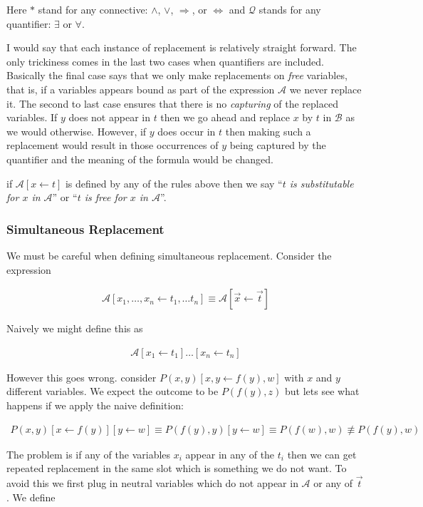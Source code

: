 \documentclass[12pt]{article}
\newcommand{\mc}[1]{\mathcal{#1}}
\begin{document}
Here $\ast$ stand for any connective: $\land$, $\lor$, $\Rightarrow$, or $\Leftrightarrow$ and $\mathcal{Q}$ stands for any quantifier: $\exists$ or $\forall$.

I would say that each instance of replacement is relatively straight forward. The only trickiness comes in the last two cases when quantifiers are included. Basically the final case says that we only make replacements on \textit{free} variables, that is, if a variables appears bound as part of the expression $\mc{A}$ we never replace it.
The second to last case ensures that there is no \textit{capturing} of the replaced variables. If $y$ does not appear in $t$ then we go ahead and replace $x$ by $t$ in $\mc{B}$ as we would otherwise. However, if $y$ does occur in $t$ then making such a replacement would result in those occurrences of $y$ being captured by the quantifier and the meaning of the formula would be changed.

if $\mc{A}[x\leftarrow t]$ is defined by any of the rules above then we say ``\textit{$t$ is substitutable for $x$ in $\mc{A}$}'' or ``\textit{$t$ is free for $x$ in $\mc{A}$}''.

\subsubsection*{Simultaneous Replacement}

We must be careful when defining simultaneous replacement. Consider the expression

\begin{align}
\mc{A}[x_1,\ldots, x_n\leftarrow t_1,\ldots t_n] \equiv \mc{A}[\vec{x}\leftarrow \vec{t}]
\end{align}

Naively we might define this as 

\begin{align}
\mc{A}[x_1\leftarrow t_1]\ldots[x_n\leftarrow t_n]
\end{align}

However this goes wrong. consider $P(x,y)[x,y\leftarrow f(y), w]$ with $x$ and $y$ different variables. We expect the outcome to be $P(f(y),z)$ but lets see what happens if we apply the naive definition:

\begin{align}
P(x,y)[x\leftarrow f(y)][y\leftarrow w] \equiv P(f(y),y)[y\leftarrow w] \equiv P(f(w),w) \not\equiv P(f(y),w)
\end{align}

The problem is if any of the variables $x_i$ appear in any of the $t_i$ then we can get repeated replacement in the same slot which is something we do not want. To avoid this we first plug in neutral variables which do not appear in $\mc{A}$ or any of $\vec{t}$. We define
\end{document}
